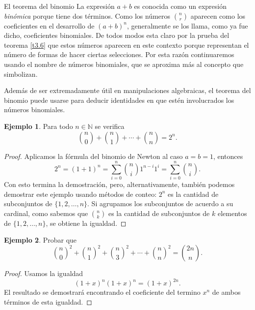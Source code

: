 \documentclass[11pt,spanish,makeidx]{amsbook}
\theoremstyle{definition}
\newtheorem{ejemplo}{Ejemplo}[section]
\theoremstyle{remark}
\begin{document}
\begin{section}{El teorema del binomio}
La expresión $a+b$ es conocida como un expresión {\it binómica} porque tiene dos términos. Como los números   $\binom{n}{r}$ aparecen como los coeficientes en el desarrollo de $(a+b)^n$, generalmente se los llama, como ya fue dicho,  coeficientes binomiales.   De todos modos esta claro por la prueba del teorema \ref{t3.6} que estos números aparecen en este contexto porque representan el número de formas de hacer ciertas selecciones. Por esta razón continuaremos usando el nombre de números binomiales,  que se aproxima más al concepto que simbolizan.

Además de ser extremadamente útil en manipulaciones algebraicas, el teorema del binomio puede usarse para deducir identidades en que estén involucrados los números binomiales.


\begin{ejemplo}
	Para todo $n \in \mathbb N$ se verifica 
	\begin{equation*}
		\displaystyle{\binom{n}{0} + \binom{n}{1} + \cdots + \binom{n}{n} = 2^n}.
	\end{equation*}
\end{ejemplo}
\begin{proof}
	Aplicamos la fórmula del binomio de Newton  al caso $a=b=1$, entonces
	\begin{equation*}
		2^n = (1+1)^n =  \sum_{i=0}^{n} \binom{n}{i}1^{n-i}1^{i} = \sum_{i=0}^{n} \binom{n}{i}.
	\end{equation*}
	Con esto termina la demostración, pero, alternativamente, también podemos demostrar este ejemplo usando métodos de conteo: $2^n$ es la cantidad de subconjuntos de $\{1,2,\dots,n\}$. Si agrupamos los subconjuntos de acuerdo a su cardinal, como sabemos que $\binom{n}{k}$ es la cantidad de subconjuntos de $k$ elementos de  $\{1,2,\dots,n\}$, se obtiene la igualdad.
\end{proof}


\begin{ejemplo}Probar que
\begin{equation}\label{eqcuaddo}
\binom{n}{0}^2+\binom{n}{1}^2+\binom{n}{3}^2+\cdots+\binom{n}{n}^2=
\binom{2n}{n}.
\end{equation}
\end{ejemplo}
\begin{proof}
Usamos la igualdad
\begin{equation*}\label{eqxn}
(1+x)^n(1+x)^n=(1+x)^{2n}.
\end{equation*}
El resultado se demostrará encontrando el coeficiente del termino $x^n$ de ambos términos de esta igualdad.


\end{proof}
\end{section}
\end{document}
